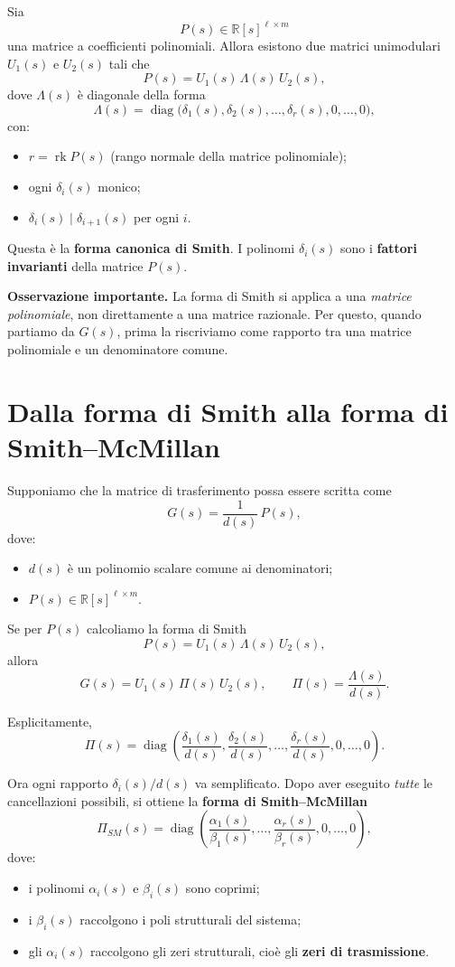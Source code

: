 Sia
\[
P(s)\in \mathbb{R}[s]^{\ell\times m}
\]
una matrice a coefficienti polinomiali. Allora esistono due matrici unimodulari \(U_1(s)\) e \(U_2(s)\) tali che
\[
P(s)=U_1(s)\,\Lambda(s)\,U_2(s),
\]
dove \(\Lambda(s)\) è diagonale della forma
\[
\Lambda(s)=
\operatorname{diag}\bigl(\delta_1(s),\delta_2(s),\dots,\delta_r(s),0,\dots,0\bigr),
\]
con:
\begin{itemize}
    \item \(r=\operatorname{rk}P(s)\) (rango normale della matrice polinomiale);
    \item ogni \(\delta_i(s)\) monico;
    \item \(\delta_i(s)\mid \delta_{i+1}(s)\) per ogni \(i\).
\end{itemize}

Questa è la \textbf{forma canonica di Smith}. I polinomi \(\delta_i(s)\) sono i \textbf{fattori invarianti} della matrice \(P(s)\).

\medskip

\noindent
\textbf{Osservazione importante.}
La forma di Smith si applica a una \emph{matrice polinomiale}, non direttamente a una matrice razionale. Per questo, quando partiamo da \(G(s)\), prima la riscriviamo come rapporto tra una matrice polinomiale e un denominatore comune.

\bigskip

\section{Dalla forma di Smith alla forma di Smith--McMillan}

Supponiamo che la matrice di trasferimento possa essere scritta come
\[
G(s)=\frac{1}{d(s)}\,P(s),
\]
dove:
\begin{itemize}
    \item \(d(s)\) è un polinomio scalare comune ai denominatori;
    \item \(P(s)\in\mathbb{R}[s]^{\ell\times m}\).
\end{itemize}

Se per \(P(s)\) calcoliamo la forma di Smith
\[
P(s)=U_1(s)\,\Lambda(s)\,U_2(s),
\]
allora
\[
G(s)=U_1(s)\,\Pi(s)\,U_2(s),
\qquad
\Pi(s)=\frac{\Lambda(s)}{d(s)}.
\]

Esplicitamente,
\[
\Pi(s)=
\operatorname{diag}\!\left(
\frac{\delta_1(s)}{d(s)},
\frac{\delta_2(s)}{d(s)},
\dots,
\frac{\delta_r(s)}{d(s)},
0,\dots,0
\right).
\]

Ora ogni rapporto \(\delta_i(s)/d(s)\) va semplificato. Dopo aver eseguito \emph{tutte} le cancellazioni possibili, si ottiene la \textbf{forma di Smith--McMillan}
\[
\Pi_{SM}(s)=
\operatorname{diag}\!\left(
\frac{\alpha_1(s)}{\beta_1(s)},
\dots,
\frac{\alpha_r(s)}{\beta_r(s)},
0,\dots,0
\right),
\]
dove:
\begin{itemize}
    \item i polinomi \(\alpha_i(s)\) e \(\beta_i(s)\) sono coprimi;
    \item i \(\beta_i(s)\) raccolgono i poli strutturali del sistema;
    \item gli \(\alpha_i(s)\) raccolgono gli zeri strutturali, cioè gli \textbf{zeri di trasmissione}.
\end{itemize}

